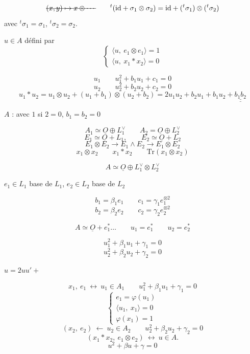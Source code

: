 \documentclass[11pt,a4paper]{article}
\begin{document}
\[
\text{\struck{$(x,y)\mapsto x\otimes\cdots$}}\qquad
{}^t(\mathrm{id}+\sigma_1\otimes\sigma_2)=\mathrm{id}+({}^t\sigma_1)\otimes({}^t\sigma_2)
\]
avec ${}^t\sigma_1=\sigma_1$, ${}^t\sigma_2=\sigma_2$.

$u\in A$ défini par
\[
\begin{cases}
\langle u,\ e_1\otimes e_1\rangle=1\\
\langle u,\ x_1*x_2\rangle=0
\end{cases}
\]

\[
u_1\qquad u_1^2+b_1u_1+c_1=0
\]
\[
u_2\qquad u_2^2+b_2u_2+c_2=0
\]
\[
u_1*u_2=u_1\otimes u_2+(u_1+b_1)\otimes(u_2+b_2)=2u_1u_2+b_2u_1+b_1u_2+\underline{\underline{b_1b_2}}
\]
\struck{\ill{} \ill{} \ill{}} \ill{} 

$A$ : avec $1$ \qquad \ill{} si $2=0$, $b_1=b_2=0$

\[
A_1\simeq\underline{O}\oplus L_1^{\vee}\qquad A_2=\underline{O}\oplus L_2^{\vee}
\]
\[
E_1\simeq\underline{O}+L_1,\qquad E_2\simeq\underline{O}+L_2
\]
\[
E_1\otimes E_2\to E_1\wedge E_2\to E_1\otimes E_2
\]
\[
x_1\otimes x_2\qquad x_1*x_2\qquad \mathrm{Tr}(x_1\otimes x_2)
\]

\[
A\simeq\underline{O}\oplus L_1^{\vee}\otimes L_2^{\vee}
\]

$e_1\in L_1$ base de $L_1$, \qquad $e_2\in L_2$ base de $L_2$

\[
b_1=\beta_1e_1\qquad c_1=\gamma_1e_1^{\otimes 2}
\]
\[
b_2=\beta_2e_2\qquad c_2=\gamma_2e_2^{\otimes 2}
\]

\[
A\simeq\underline{O}+e_1^{*}\ldots\qquad u_1=e_1^{*}\qquad u_2=e_2^{*}
\]

\[
u_1^2+\beta_1u_1+\gamma_1=0
\]
\[
u_2^2+\beta_2u_2+\gamma_2=0
\]

$u=2uu'+$

\[
x_1,\ e_1\ \longleftrightarrow\ u_1\in A_1\qquad u_1^2+\beta_1u_1+\gamma_1=0
\]
\[
\begin{cases}
e_1=\varphi(u_1)\\
\langle u_1,\ x_1\rangle=0\\
\varphi(x_1)=1
\end{cases}
\]
\[
(x_2,\ e_2)\ \longleftarrow\ u_2\in A_2\qquad u_2^2+\beta_2u_2+\gamma_2=0
\]
\[
(x_1*x_2,\ e_1\otimes e_2)\ \longleftrightarrow\ u\in A.
\]
\[
u^2+\beta u+\gamma=0
\]
\end{document}
